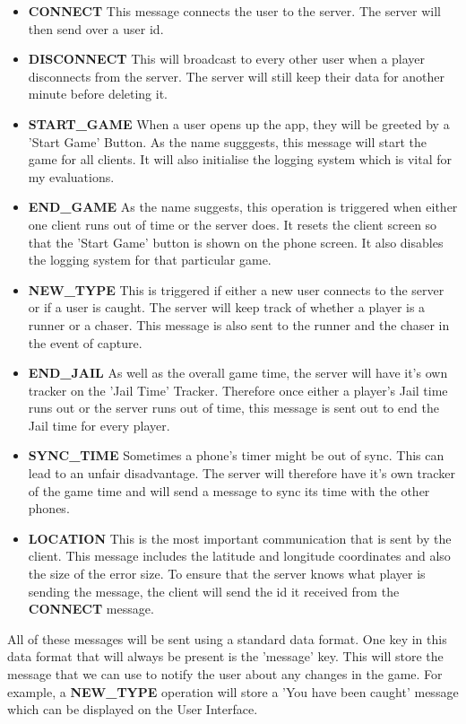 \documentclass{l4proj}
\begin{document}
\begin{itemize}
    \item \textbf{CONNECT} This message connects the user to the server. The server will then send over a user id.
    \item \textbf{DISCONNECT} This will broadcast to every other user when a player disconnects from the server. The server will still keep their data for another minute before deleting it.
    \item \textbf{START\_GAME} When a user opens up the app, they will be greeted by a 'Start Game' Button. As the name sugggests,
    this message will start the game for all clients. It will also initialise the logging system which is vital for my evaluations.
    \item \textbf{END\_GAME} As the name suggests, this operation is triggered when either one client runs out of time or the server
    does. It resets the client screen so that the 'Start Game' button is shown on the phone screen. It also disables the logging system
    for that particular game.
    \item \textbf{NEW\_TYPE} This is triggered if either a new user connects to the server or if a user is caught. The server will keep track of whether a player is a runner or a chaser. This message is also sent
    to the runner and the chaser in the event of capture.
    \item \textbf{END\_JAIL} As well as the overall game time, the server will have it's own tracker on the 'Jail Time' Tracker. Therefore once either a player's Jail time runs out or the server runs
    out of time, this message is sent out to end the Jail time for every player.
    \item \textbf{SYNC\_TIME} Sometimes a phone's timer might be out of sync. This can lead to an unfair disadvantage. The server will therefore have it's own tracker of the game time and will send a message to sync its time with the other phones.
    \item \textbf{LOCATION} This is the most important communication that is sent by the client. This message 
    includes the latitude and longitude coordinates and also the size of the error size. To ensure that the server knows what player is sending the message, the client will send the id it received from the \textbf{CONNECT} message. 
\end{itemize}

All of these messages will be sent using a standard data format. One key in this data format that will always be present is the
'message' key. This will store the message that we can use to notify the user about any changes in the game. For example, a 
\textbf{NEW\_TYPE} operation will store a 'You have been caught' message which can be displayed on the User Interface.
\end{document}
